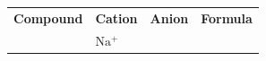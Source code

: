 \begin{enumerate}[noitemsep, label=\textbf{\arabic*}. ]
{    %
    
        \begin{center}
      
      \label{m38689*id145067}
      
    \noindent
      \tablelasttail{}
      \begin{xtabular*}{\mytablewidth}[t]{|p{10\mystarwidth}|p{10\mystarwidth}|p{10\mystarwidth}|p{10\mystarwidth}|}\hline
    
    
        \textbf{Compound} &
    
    
        \textbf{Cation} &
    
    
        \textbf{Anion} &
    
    
        \textbf{Formula}%
     \tabularnewline{}
    
    
         &
    
    
        \begin{math}\mathrm{Na}{}^{+}\end{math} &
    

\end{xtabular*}
\end{center}}
\end{enumerate}
